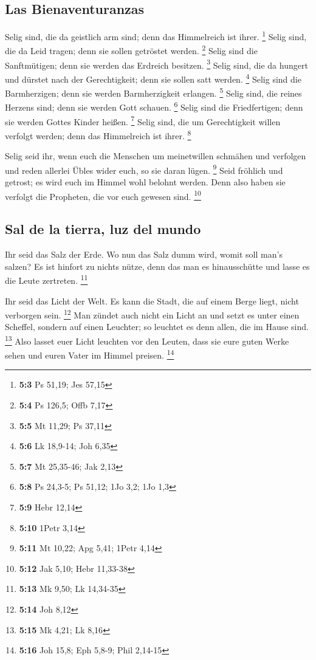\hypertarget{las-bienaventuranzas}{%
\subsection{Las Bienaventuranzas}\label{las-bienaventuranzas}}

 Selig sind, die da geistlich arm sind; denn das
Himmelreich ist ihrer. \footnote{\textbf{5:3} Ps 51,19; Jes 57,15}
 Selig sind, die da Leid tragen; denn sie sollen getröstet
werden. \footnote{\textbf{5:4} Ps 126,5; Offb 7,17}  Selig
sind die Sanftmütigen; denn sie werden das Erdreich besitzen.
\footnote{\textbf{5:5} Mt 11,29; Ps 37,11}  Selig sind,
die da hungert und dürstet nach der Gerechtigkeit; denn sie sollen satt
werden. \footnote{\textbf{5:6} Lk 18,9-14; Joh 6,35} 
Selig sind die Barmherzigen; denn sie werden Barmherzigkeit erlangen.
\footnote{\textbf{5:7} Mt 25,35-46; Jak 2,13}  Selig sind,
die reines Herzens sind; denn sie werden Gott schauen. \footnote{\textbf{5:8}
  Ps 24,3-5; Ps 51,12; 1Jo 3,2; 1Jo 1,3}  Selig sind die
Friedfertigen; denn sie werden Gottes Kinder heißen. \footnote{\textbf{5:9}
  Hebr 12,14}  Selig sind, die um Gerechtigkeit willen
verfolgt werden; denn das Himmelreich ist ihrer. \footnote{\textbf{5:10}
  1Petr 3,14}

 Selig seid ihr, wenn euch die Menschen um meinetwillen
schmähen und verfolgen und reden allerlei Übles wider euch, so sie daran
lügen. \footnote{\textbf{5:11} Mt 10,22; Apg 5,41; 1Petr 4,14}
 Seid fröhlich und getrost; es wird euch im Himmel wohl
belohnt werden. Denn also haben sie verfolgt die Propheten, die vor euch
gewesen sind. \footnote{\textbf{5:12} Jak 5,10; Hebr 11,33-38}

\hypertarget{sal-de-la-tierra-luz-del-mundo}{%
\subsection{Sal de la tierra, luz del
mundo}\label{sal-de-la-tierra-luz-del-mundo}}

 Ihr seid das Salz der Erde. Wo nun das Salz dumm wird,
womit soll man's salzen? Es ist hinfort zu nichts nütze, denn das man es
hinausschütte und lasse es die Leute zertreten. \footnote{\textbf{5:13}
  Mk 9,50; Lk 14,34-35}

 Ihr seid das Licht der Welt. Es kann die Stadt, die auf
einem Berge liegt, nicht verborgen sein. \footnote{\textbf{5:14} Joh
  8,12}  Man zündet auch nicht ein Licht an und setzt es
unter einen Scheffel, sondern auf einen Leuchter; so leuchtet es denn
allen, die im Hause sind. \footnote{\textbf{5:15} Mk 4,21; Lk 8,16}
 Also lasset euer Licht leuchten vor den Leuten, dass sie
eure guten Werke sehen und euren Vater im Himmel preisen. \footnote{\textbf{5:16}
  Joh 15,8; Eph 5,8-9; Phil 2,14-15}

